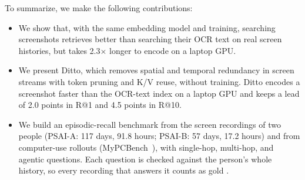 To summarize, we make the following contributions:
\begin{itemize}
\item We show that, with the same embedding model and training, searching
  screenshots retrieves better than searching their OCR text on real screen
  histories, but takes 2.3$\times$ longer to encode on a laptop GPU.
\item We present Ditto, which removes spatial and temporal redundancy in
  screen streams with token pruning and K/V reuse, without training. Ditto
  encodes a screenshot faster than the OCR-text index on a laptop GPU and
  keeps a lead of 2.0 points in R@1 and 4.5 points in R@10.
\item We build an episodic-recall benchmark from the screen recordings of two
  people (PSAI-A: 117 days, 91.8 hours; PSAI-B: 57 days, 17.2 hours) and from
  computer-use rollouts (MyPCBench~\cite{jang2026mypcbench}), with
  single-hop, multi-hop, and agentic questions. Each question is checked
  against the person's whole history, so every recording that answers it
  counts as gold .
\end{itemize}
